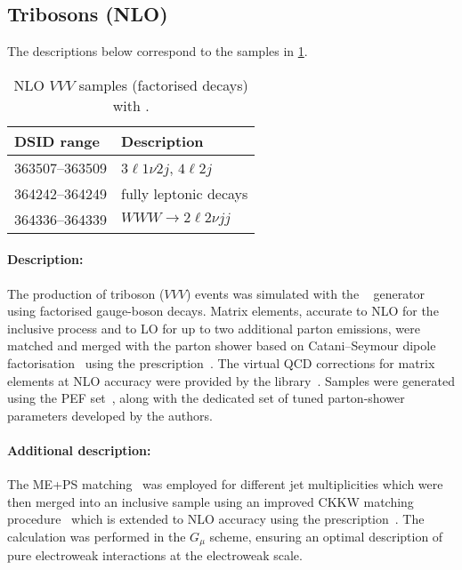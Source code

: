 


\subsection{Tribosons (NLO)}

The descriptions below correspond to the samples in
\cref{tab:MB-sherpa-vvvnlo}.

\begin{table}[htbp]
  \caption{NLO \(VVV\) samples (factorised decays) with \SHERPA.}%
  \label{tab:MB-sherpa-vvvnlo}
  \centering
  \begin{tabular}{l l}
    \toprule
    DSID range & Description \\
    \midrule
    363507--363509   & \(3\ell1\nu2j\), \(4\ell2j\)\\
    364242--364249   & fully leptonic decays\\
    364336--364339   & \(WWW\to 2\ell2\nu jj\)\\
    \bottomrule
  \end{tabular}
\end{table}

\paragraph{Description:}

The production of triboson (\(VVV\)) events was simulated with the
\SHERPA[2.2.2]~\cite{Bothmann:2019yzt} generator using factorised gauge-boson decays.
Matrix elements, accurate to NLO for the inclusive process and to LO for up to
two additional parton emissions, were matched and merged with the \SHERPA parton
shower based on Catani--Seymour dipole factorisation~\cite{Gleisberg:2008fv,Schumann:2007mg}
using the \MEPSatNLO prescription~\cite{Hoeche:2011fd,Hoeche:2012yf,Catani:2001cc,Hoeche:2009rj}.
The virtual QCD corrections for matrix elements at NLO accuracy were
provided by the \OPENLOOPS library~\cite{Buccioni:2019sur,Cascioli:2011va,Denner:2016kdg}.
Samples were generated using the \NNPDF[3.0nnlo] PEF set~\cite{Ball:2014uwa}, along with
the dedicated set of tuned parton-shower parameters developed by the \SHERPA authors.


\paragraph{Additional description:}

The ME+PS matching~\cite{Hoeche:2011fd} was employed for different jet
multiplicities which were then merged into an inclusive sample
using an improved CKKW matching procedure~\cite{Catani:2001cc,Hoeche:2009rj} which is extended to NLO
accuracy using the \MEPSatNLO prescription~\cite{Hoeche:2012yf}.  The
calculation was performed in the \(G_\mu\) scheme, ensuring an optimal description of pure electroweak interactions at the
electroweak scale.

